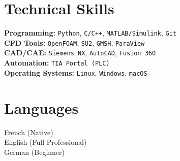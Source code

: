 \documentclass[a4paper,10pt]{article}
\begin{document}
\begin{multicols}{2}

\section*{Technical Skills}
\textbf{Programming:} \texttt{Python}, \texttt{C/C++}, \texttt{MATLAB/Simulink}, \texttt{Git}  \\
\textbf{CFD Tools:} \texttt{OpenFOAM}, \texttt{SU2}, \texttt{GMSH}, \texttt{ParaView} \\
\textbf{CAD/CAE:} \texttt{Siemens NX}, \texttt{AutoCAD}, \texttt{Fusion 360} \\
\textbf{Automation:} \texttt{TIA Portal (PLC)}\\
\textbf{Operating Systems:} \texttt{Linux}, \texttt{Windows}, \texttt{macOS} \\

\columnbreak
\section*{Languages}
French (Native) \\ English (Full Professional) \\ German (Beginner)

\end{multicols}
\end{document}
